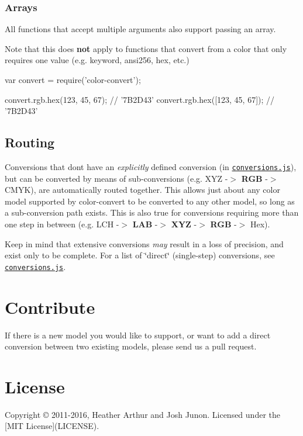 \subsubsection*{Arrays}

All functions that accept multiple arguments also support passing an array.

Note that this does {\bfseries not} apply to functions that convert from a color that only requires one value (e.\+g. {\ttfamily keyword}, {\ttfamily ansi256}, {\ttfamily hex}, etc.)


\begin{DoxyCode}
var convert = require('color-convert');

convert.rgb.hex(123, 45, 67);      // '7B2D43'
convert.rgb.hex([123, 45, 67]);    // '7B2D43'
\end{DoxyCode}


\subsection*{Routing}

Conversions that don\textquotesingle{}t have an {\itshape explicitly} defined conversion (in \href{conversions.js}{\tt conversions.\+js}), but can be converted by means of sub-\/conversions (e.\+g. X\+YZ -\/$>$ {\bfseries R\+GB} -\/$>$ C\+M\+YK), are automatically routed together. This allows just about any color model supported by {\ttfamily color-\/convert} to be converted to any other model, so long as a sub-\/conversion path exists. This is also true for conversions requiring more than one step in between (e.\+g. L\+CH -\/$>$ {\bfseries L\+AB} -\/$>$ {\bfseries X\+YZ} -\/$>$ {\bfseries R\+GB} -\/$>$ Hex).

Keep in mind that extensive conversions {\itshape may} result in a loss of precision, and exist only to be complete. For a list of \char`\"{}direct\char`\"{} (single-\/step) conversions, see \href{conversions.js}{\tt conversions.\+js}.

\section*{Contribute}

If there is a new model you would like to support, or want to add a direct conversion between two existing models, please send us a pull request.

\section*{License}

Copyright \copyright{} 2011-\/2016, Heather Arthur and Josh Junon. Licensed under the \mbox{[}M\+IT License\mbox{]}(L\+I\+C\+E\+N\+SE). 